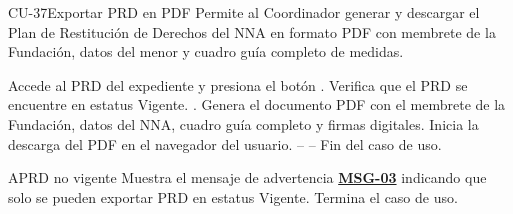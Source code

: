 \begin{UseCase}{CU-37}{Exportar PRD en PDF}{
	Permite al Coordinador generar y descargar el Plan de Restitución de Derechos del NNA en formato PDF con membrete de la Fundación, datos del menor y cuadro guía completo de medidas.
}
\end{UseCase}

\begin{UCtrayectoria}
	\UCpaso[\UCactor] Accede al PRD del expediente y presiona el botón .
	\UCpaso Verifica que el PRD se encuentre en estatus Vigente. .
	\UCpaso Genera el documento PDF con el membrete de la Fundación, datos del NNA, cuadro guía completo y firmas digitales.
	\UCpaso Inicia la descarga del PDF en el navegador del usuario.
	\UCpaso[] -- -- Fin del caso de uso.
\end{UCtrayectoria}

\begin{UCtrayectoriaA}{A}{PRD no vigente}
	\UCpaso Muestra el mensaje de advertencia \hyperlink{mMSG03}{\bf MSG-03} indicando que solo se pueden exportar PRD en estatus Vigente.
	\UCpaso Termina el caso de uso.
\end{UCtrayectoriaA}

